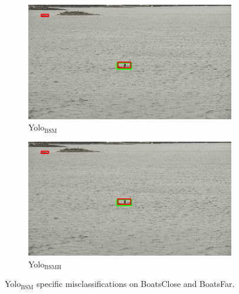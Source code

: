 \begin{figure}[h!]
\begin{subfigure}{.5\textwidth}
  \centering
  \includegraphics[width=0.9\linewidth]{results/case_buildings/yolo23/samemistake/yolo2/selected_08_07_frame13555.jpg}
  \caption{Yolo$_{\text{BSM}}$}
\end{subfigure}%
\begin{subfigure}{.5\textwidth}
  \centering
  \includegraphics[width=.9\linewidth]{results/case_buildings/yolo23/samemistake/yolo2/selected_08_07_frame13555.jpg}
  \caption{Yolo$_{\text{BSMH}}$}
\end{subfigure}
\caption{Yolo$_{\text{BSM}}$ specific misclassifications on BoatsClose and BoatsFar.}
\label{img:yolo2_misclas}


\end{figure}
